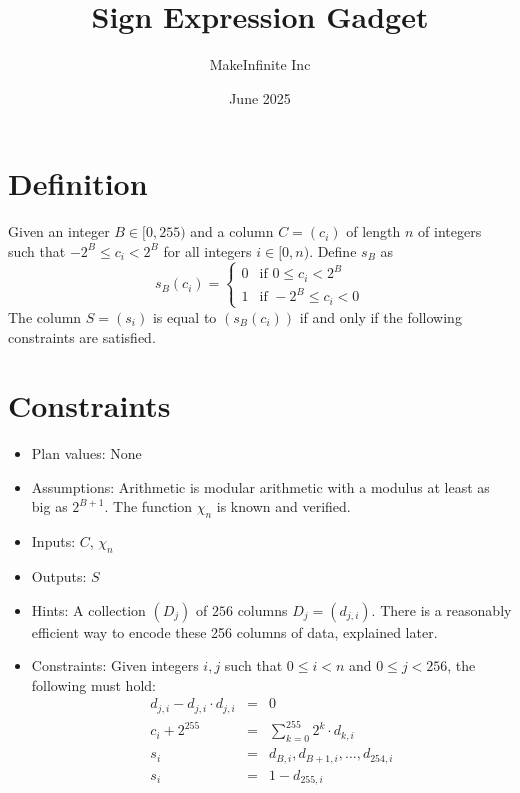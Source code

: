 \documentclass[11pt]{article}
\title{Sign Expression Gadget}
\author{MakeInfinite Inc}
\date{June 2025}
\begin{document}
\maketitle

\section{Definition}
\noindent Given an integer $B\in [0,255)$ and a column $C=(c_{i})$ of length $n$ of integers such that $-2^B\leq c_i<2^B$ for all integers $i\in[0,n)$. Define $s_B$ as 
$$s_B(c_i) = 
\begin{cases} 
0 & \text{if } 0\leq c_i<2^B\\
1 & \text{if } -2^B\leq c_i<0
\end{cases}$$
The column $S=(s_i)$ is equal to $(s_B(c_i))$ if and only if the following constraints are satisfied.
\section{Constraints}
\begin{itemize}
    \item Plan values: None
    \item Assumptions: Arithmetic is modular arithmetic with a modulus at least as big as $2^{B+1}$. The function $\chi_n$ is known and verified.
    \item Inputs: $C$, $\chi_n$
    \item Outputs: $S$
    \item Hints: A collection $(D_j)$ of $256$ columns $D_j=(d_{j,i})$. There is a reasonably efficient way to encode these 256 columns of data, explained later.
    \item Constraints:
    Given integers $i, j$ such that $0\leq i<n$ and $0\leq j<256$, the following must hold:
    \begin{eqnarray}
d_{j,i} - d_{j,i}\cdot d_{j,i}&=&0 \\
c_i+2^{255}&=&\sum_{k=0}^{255} 2^k\cdot d_{k,i} \\
s_i&=&d_{B,i}, d_{B+1,i},\ldots, d_{254,i}\\
s_i&=&1-d_{255,i}
\end{eqnarray}


\end{itemize}
\end{document}
